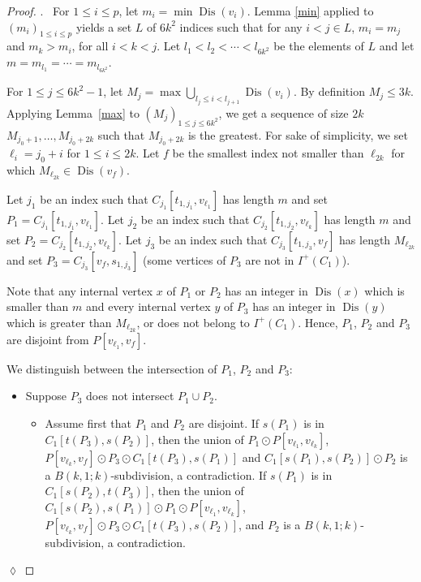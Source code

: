 \documentclass[utf8,10pt]{article}
\theoremstyle{plain}
\theoremstyle{definition}
\theoremstyle{remark}
\newenvironment{subproof}{\par\noindent {\it Subproof}.\ }{\hfill$\lozenge$\par\vspace{11pt}}
\DeclareMathOperator{\Dis}{Dis}
\begin{document}
\begin{proof}
\begin{subproof}
For $1\leq i\leq p$, let $m_i = \min \Dis(v_i)$. 
Lemma \ref{min} applied to $(m_i)_{1\leq i\leq p}$ yields a set $L$ of $6k^2$ indices such that 
for any $i< j \in L$,  $m_i=m_j$ and $m_k > m_i$, for all $i< k < j$.
Let $l_1 < l_2 < \cdots < l_{6k^2}$ be the elements of $L$ and let $m= m_{l_1} = \cdots = m_{l_{6k^2}}$.


For $1\leq j\leq 6k^2-1$, let $M_j = \max \bigcup_{l_j\leq i < l_{j+1}} \Dis(v_i)$.
By definition $M_j\leq 3k$.
Applying Lemma~\ref{max} to $(M_j)_{1\leq j\leq 6k^2}$,  we get a sequence of size $2k$ $M_{j_0+1}, \dots , M_{j_0+{2k}}$ such that $M_{j_0+{2k}}$ is the greatest. For sake of simplicity, we set $\ell_i =j_0+i$ for $1\leq i\leq 2k$.
Let $f$ be the smallest index not smaller than $\ell_{2k}$ for which $M_{\ell_{2k}} \in \Dis (v_f)$. 

Let $j_1$ be an index such that $C_{j_1}[t_{1,j_1},v_{\ell_1}]$ has length $m$ and set $P_1=C_{j_1}[t_{1,j_1},v_{\ell_1}]$.
Let $j_2$ be an index such that $C_{j_2}[t_{1,j_2},v_{\ell_k}]$ has length $m$ and set $P_2=C_{j_2}[t_{1,j_2},v_{\ell_k}]$.
Let $j_3$ be an index such that  $C_{j_3}[t_{1,j_3},v_{f}]$ has length $M_{\ell_{2k}}$ and set $P_3=C_{j_3}[v_f, s_{1,j_3}]$ (some vertices of $P_3$ are not in $I^+(C_1)$).

Note that any internal vertex $x$ of $P_1$ or $P_2$ has an integer in $\Dis(x)$
which is smaller than $m$ and every internal vertex $y$ of $P_3$ has an integer in $\Dis(y)$ which
is greater than $M_{\ell_{2k}}$, or does not belong to $I^+(C_1)$. Hence, 
$P_1$, $P_2$ and $P_3$ are disjoint from $P[v_{\ell_1},v_f]$. 


We distinguish between the intersection of $P_1$, $P_2$ and $P_3$:

\begin{itemize}
	\item Suppose $P_3$ does not intersect $P_1 \cup P_2$.
	\begin{itemize}
		\item Assume first that $P_1$ and $P_2$ are disjoint. If $s(P_1)$ is in $C_1[t(P_3), s(P_2)]$, then the union of  $P_1 \odot P[v_{\ell_1}, v_{\ell_k}]$, $P[v_{\ell_k}, v_f] \odot P_3\odot C_1[t(P_3), s(P_1)]$ and $C_1[s(P_1), s(P_2)]\odot P_2$ is a $B(k,1;k)$-subdivision, a contradiction.
		 If $s(P_1)$ is in $C_1[ s(P_2), t(P_3)]$, then the union of  $C_1[s(P_2), s(P_1)]\odot P_1\odot P[v_{\ell_1}, v_{\ell_k}]$, $P[v_{\ell_k}, v_f]\odot  P_3\odot C_1[t(P_3), s(P_2)]$, and  $P_2$ is a $B(k,1;k)$-subdivision, a contradiction.
	

\end{itemize}
\end{itemize}
\end{subproof}
\end{proof}
\end{document}
